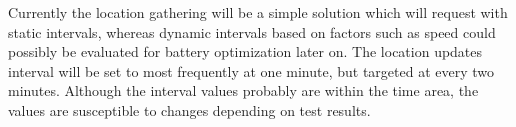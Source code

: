 Currently the location gathering will be a simple solution which will request with static intervals, whereas dynamic intervals based on factors such as speed could possibly be evaluated for battery optimization later on.
The location updates interval will be set to most frequently at one minute, but targeted at every two minutes.
Although the interval values probably are within the time area, the values are susceptible to changes depending on test results.